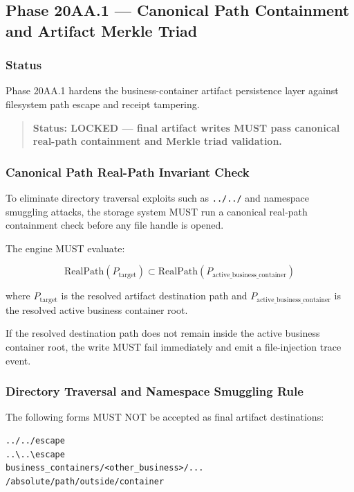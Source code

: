 \subsection{Phase 20AA.1 --- Canonical Path Containment and Artifact Merkle Triad}

\subsubsection{Status}

Phase 20AA.1 hardens the business-container artifact persistence layer against filesystem path escape and receipt tampering.

\begin{quote}
\textbf{Status: LOCKED --- final artifact writes MUST pass canonical real-path containment and Merkle triad validation.}
\end{quote}

\subsubsection{Canonical Path Real-Path Invariant Check}

To eliminate directory traversal exploits such as \texttt{../../} and namespace smuggling attacks, the storage system MUST run a canonical real-path containment check before any file handle is opened.

The engine MUST evaluate:

\begin{equation}
\mathrm{RealPath}(P_{\mathrm{target}})
\subset
\mathrm{RealPath}(P_{\mathrm{active\_business\_container}})
\end{equation}

where \(P_{\mathrm{target}}\) is the resolved artifact destination path and \(P_{\mathrm{active\_business\_container}}\) is the resolved active business container root.

If the resolved destination path does not remain inside the active business container root, the write MUST fail immediately and emit a file-injection trace event.

\subsubsection{Directory Traversal and Namespace Smuggling Rule}

The following forms MUST NOT be accepted as final artifact destinations:

\begin{verbatim}
../../escape
..\..\escape
business_containers/<other_business>/...
/absolute/path/outside/container
\end{verbatim}

